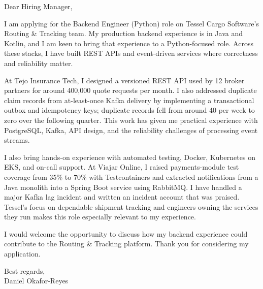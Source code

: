 \documentclass[11pt,a4paper]{article}
\begin{document}
Dear Hiring Manager,

I am applying for the Backend Engineer (Python) role on Tessel Cargo Software's Routing \& Tracking team. My production backend experience is in Java and Kotlin, and I am keen to bring that experience to a Python-focused role. Across these stacks, I have built REST APIs and event-driven services where correctness and reliability matter.

At Tejo Insurance Tech, I designed a versioned REST API used by 12 broker partners for around 400,000 quote requests per month. I also addressed duplicate claim records from at-least-once Kafka delivery by implementing a transactional outbox and idempotency keys; duplicate records fell from around 40 per week to zero over the following quarter. This work has given me practical experience with PostgreSQL, Kafka, API design, and the reliability challenges of processing event streams.

I also bring hands-on experience with automated testing, Docker, Kubernetes on EKS, and on-call support. At Viajar Online, I raised payments-module test coverage from 35\% to 70\% with Testcontainers and extracted notifications from a Java monolith into a Spring Boot service using RabbitMQ. I have handled a major Kafka lag incident and written an incident account that was praised. Tessel's focus on dependable shipment tracking and engineers owning the services they run makes this role especially relevant to my experience.

I would welcome the opportunity to discuss how my backend experience could contribute to the Routing \& Tracking platform. Thank you for considering my application.

Best regards,\\
Daniel Okafor-Reyes
\end{document}
